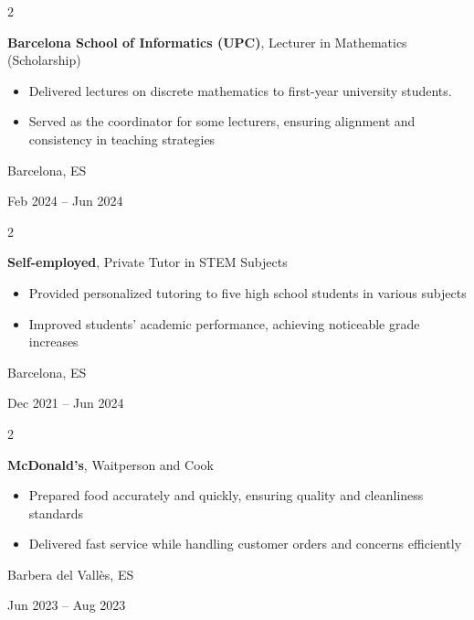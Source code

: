 \documentclass[10pt, letterpaper]{article}
\newenvironment{highlights}{
    \begin{itemize}[
        topsep=0.10 cm,
        parsep=0.10 cm,
        partopsep=0pt,
        itemsep=0pt,
        leftmargin=0.4 cm + 10pt
    ]
}{
    \end{itemize}
} %
\newenvironment{twocolentry}[2][]{
    \onecolentry
    \def\secondColumn{#2}
    \setcolumnwidth{\fill, 4.5 cm}
    \begin{paracol}{2}
}{
    \switchcolumn \raggedleft \secondColumn
    \end{paracol}
    \endonecolentry
} %
\begin{document}
        \begin{twocolentry}{
            Barcelona, ES

            Feb 2024 – Jun 2024
        }
            \textbf{Barcelona School of Informatics (UPC)}, Lecturer in Mathematics (Scholarship)
            \begin{highlights}
                \item Delivered lectures on discrete mathematics to first-year university students.
                \item Served as the coordinator for some lecturers, ensuring alignment and consistency in teaching strategies
            \end{highlights}
        \end{twocolentry}

        \vspace{0.2 cm}

        \begin{twocolentry}{
            Barcelona, ES

            Dec 2021 – Jun 2024
        }
            \textbf{Self-employed}, Private Tutor in STEM Subjects
            \begin{highlights}
                \item Provided personalized tutoring to five high school students in various subjects
                \item Improved students' academic performance, achieving noticeable grade increases
            \end{highlights}
        \end{twocolentry}

        \vspace{0.2 cm}

        \begin{twocolentry}{
            Barbera del Vallès, ES
            
            Jun 2023 – Aug 2023
        }
            \textbf{McDonald's}, Waitperson and Cook
            \begin{highlights}
                \item Prepared food accurately and quickly, ensuring quality and cleanliness standards
                \item Delivered fast service while handling customer orders and concerns efficiently
            \end{highlights}
        \end{twocolentry}
\end{document}
